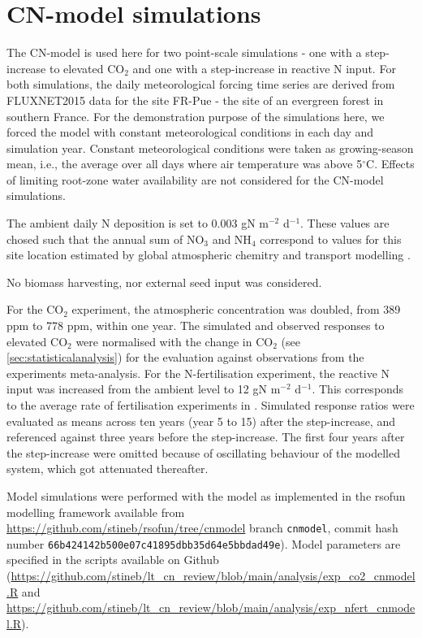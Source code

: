 \documentclass{myreport}
\begin{document}


\section{CN-model simulations}

The CN-model is used here for two point-scale simulations - one with a step-increase to elevated CO$_2$ and one with a step-increase in reactive N input. For both simulations, the daily meteorological forcing time series are derived from FLUXNET2015 data for the site FR-Pue \citep{rambal_growth_2004} - the site of an evergreen forest in southern France. For the demonstration purpose of the simulations here, we forced the model with constant meteorological conditions in each day and simulation year. Constant meteorological conditions were taken as growing-season mean, i.e., the average over all days where air temperature was above 5$^\circ$C. Effects of limiting root-zone water availability are not considered for the CN-model simulations. 

The ambient daily N deposition is set to 0.003 gN m$^{-2}$ d$^{-1}$. These values are chosed such that the annual sum of NO$_3$ and NH$_4$ correspond to values for this site location estimated by global atmospheric chemitry and transport modelling \citep{lamarque_global_2011}.

No biomass harvesting, nor external seed input was considered.

For the CO$_2$ experiment, the atmospheric concentration was doubled, from 389 ppm to 778 ppm, within one year. The simulated and observed responses to elevated CO$_2$ were normalised with the change in CO$_2$ (see \ref{sec:statisticalanalysis}) for the evaluation against observations from the experiments meta-analysis. For the N-fertilisation experiment, the reactive N input was increased from the ambient level to 12 gN m$^{-2}$ d$^{-1}$. This corresponds to the average rate of fertilisation experiments in \citep{liang_global_2020}. Simulated response ratios were evaluated as means across ten years (year 5 to 15) after the step-increase, and referenced against three years before the step-increase. The first four years after the step-increase were omitted because of oscillating behaviour of the modelled system, which got attenuated thereafter.

Model simulations were performed with the model as implemented in the {rsofun} modelling framework available from \url{https://github.com/stineb/rsofun/tree/cnmodel} branch \texttt{cnmodel}, commit hash number \texttt{66b424142b500e07c41895dbb35d64e5bbdad49e}). Model parameters are specified in the scripts available on Github (\url{https://github.com/stineb/lt_cn_review/blob/main/analysis/exp_co2_cnmodel.R} and \url{https://github.com/stineb/lt_cn_review/blob/main/analysis/exp_nfert_cnmodel.R}).

\clearpage

\end{document}
